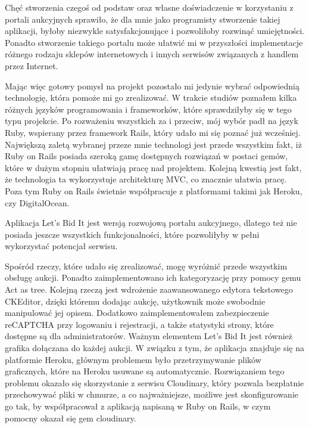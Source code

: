 \documentclass[brudnopis]{xmgr}
\begin{document}

\maketitle

\introduction

Chęć stworzenia czegoś od podstaw oraz własne doświadczenie w korzystaniu z portali aukcyjnych sprawiło, że dla mnie jako programisty stworzenie takiej aplikacji, byłoby niezwykle satysfakcjonujące i pozwoliłoby rozwinąć umiejętności. Ponadto stworzenie takiego portalu może ułatwić mi w przyszłości implementacje różnego rodzaju sklepów internetowych i innych serwisów związanych z handlem przez Internet.

Mając więc gotowy pomysł na projekt pozostało mi jedynie wybrać odpowiednią technologię, która pomoże mi go zrealizować. W trakcie studiów poznałem kilka różnych języków programowania i frameworków, które sprawdziłyby się w tego typu projekcie. Po rozważeniu wszystkich za i przeciw, mój wybór padł na język Ruby, wspierany przez framework Rails, który udało mi się poznać już wcześniej. Największą zaletą wybranej przeze mnie technologi jest przede wszystkim fakt, iż Ruby on Rails posiada szeroką gamę dostępnych rozwiązań w postaci gemów, które w dużym stopniu ułatwiają pracę nad projektem. Kolejną kwestią jest fakt, że technologia  ta wykorzystuje architekturę MVC, co znacznie ułatwia pracę. Poza tym Ruby on Rails świetnie współpracuje z platformami takimi jak Heroku, czy DigitalOcean.

Aplikacja Let's Bid It jest wersją rozwojową portalu aukcyjnego, dlatego też nie posiada jeszcze wszystkich funkcjonalności, które pozwoliłyby w pełni wykorzystać potencjał serwisu.

Spośród rzeczy, które udało się zrealizować, mogę wyróżnić przede wszystkim obsługę aukcji. Ponadto zaimplementowano ich kategoryzację przy pomocy gemu Act as tree. Kolejną rzeczą jest wdrożenie zaawansowanego edytora tekstowego CKEditor, dzięki któremu dodając aukcję, użytkownik może swobodnie manipulować jej opisem. Dodatkowo zaimplementowałem zabezpieczenie reCAPTCHA przy logowaniu i rejestracji, a także statystyki strony, które dostępne są dla administratorów. Ważnym elementem Let's Bid It jest również grafika dołączana do każdej aukcji. W związku z tym, że aplikacja znajduje się na platformie Heroku, głównym problemem było przetrzymywanie plików graficznych, które na Heroku usuwane są automatycznie. Rozwiązaniem tego problemu okazało się skorzystanie z serwisu Cloudinary, który pozwala bezpłatnie przechowywać pliki w chmurze, a co najważniejsze, możliwe jest skonfigurowanie go tak, by współpracował z aplikacją napisaną w Ruby on Rails, w czym pomocny okazał się gem cloudinary.
\end{document}
